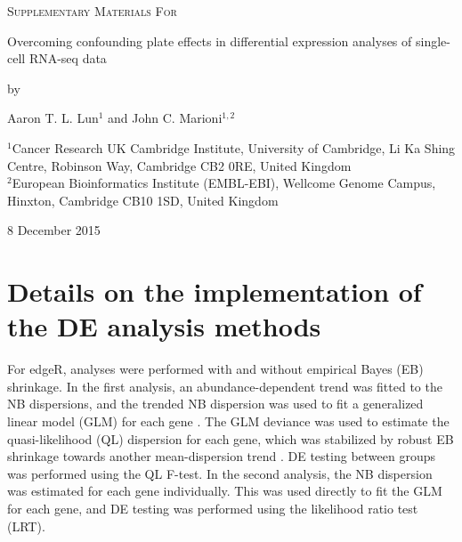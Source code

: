 \documentclass{article}
\begin{document}
\begin{titlepage}
\vspace*{3cm}
\begin{center}

\textsc{\Large Supplementary Materials For}

\vspace{1.5cm}
{\LARGE
Overcoming confounding plate effects in differential expression analyses of single-cell RNA-seq data
\par}

\vspace{0.75cm}
\large
by

\vspace{0.75cm}
Aaron T. L. Lun$^{1}$ and John C. Marioni$^{1,2}$

\vspace{1cm}
\begin{minipage}{0.9\textwidth}
\begin{flushleft} 
$^1$Cancer Research UK Cambridge Institute, University of Cambridge, Li Ka Shing Centre, Robinson Way, Cambridge CB2 0RE, United Kingdom \\[6pt]
$^2$European Bioinformatics Institute (EMBL-EBI), Wellcome Genome Campus, Hinxton, Cambridge CB10 1SD, United Kingdom \\[6pt]
\end{flushleft}
\end{minipage}

\vspace{1.5cm}
{\large 8 December 2015}

\vspace*{\fill}
\end{center}
\end{titlepage}


\section{Details on the implementation of the DE analysis methods}
For edgeR, analyses were performed with and without empirical Bayes (EB) shrinkage.
In the first analysis, an abundance-dependent trend was fitted to the NB dispersions, 
    and the trended NB dispersion was used to fit a generalized linear model (GLM) for each gene \cite{mccarthy2012differential}.
The GLM deviance was used to estimate the quasi-likelihood (QL) dispersion for each gene, 
    which was stabilized by robust EB shrinkage towards another mean-dispersion trend \cite{lund2012detecting}.
DE testing between groups was performed using the QL F-test.
In the second analysis, the NB dispersion was estimated for each gene individually.
This was used directly to fit the GLM for each gene, and DE testing was performed using the likelihood ratio test (LRT).
\end{document}
